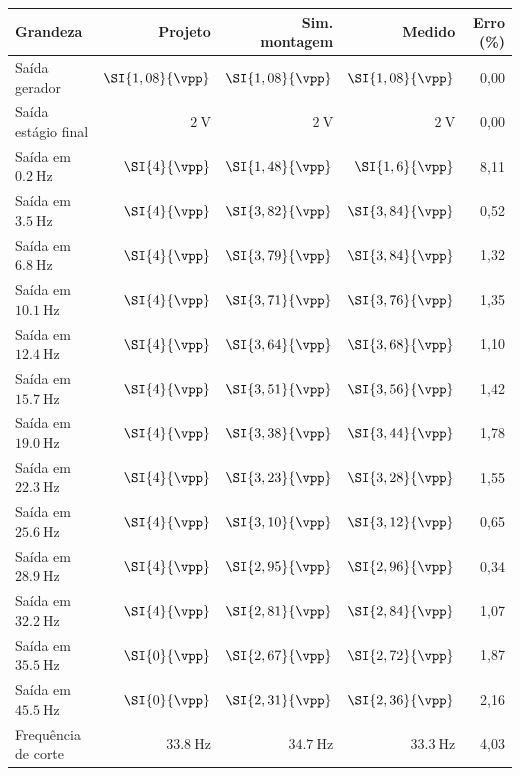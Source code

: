 \documentclass[11pt,a4paper]{article}
\begin{document}
\begin{center}
  \begin{tabular}{@{}lrrrr@{}}
    \toprule
    \textbf{Grandeza} & \textbf{Projeto} & \textbf{Sim. montagem} & \textbf{Medido} & \textbf{Erro (\%)} \\
    \midrule
    Saída gerador & $\SI{1,08}{\vpp}$ & $\SI{1,08}{\vpp}$ & $\SI{1,08}{\vpp}$ & 0,00 \\

    Saída estágio final & $\SI{2}{\volt}$ & $\SI{2}{\volt}$ & $\SI{2}{\volt}$ & 0,00 \\

    Saída em $\SI{0,2}{\hertz}$  & $\SI{4}{\vpp}$ & $\SI{1,48}{\vpp}$ & $\SI{1,6}{\vpp}$  & 8,11 \\
    Saída em $\SI{3,5}{\hertz}$  & $\SI{4}{\vpp}$ & $\SI{3,82}{\vpp}$ & $\SI{3,84}{\vpp}$ & 0,52 \\
    Saída em $\SI{6,8}{\hertz}$  & $\SI{4}{\vpp}$ & $\SI{3,79}{\vpp}$ & $\SI{3,84}{\vpp}$ & 1,32 \\
    Saída em $\SI{10,1}{\hertz}$ & $\SI{4}{\vpp}$ & $\SI{3,71}{\vpp}$ & $\SI{3,76}{\vpp}$ & 1,35 \\
    Saída em $\SI{12,4}{\hertz}$ & $\SI{4}{\vpp}$ & $\SI{3,64}{\vpp}$ & $\SI{3,68}{\vpp}$ & 1,10 \\
    Saída em $\SI{15,7}{\hertz}$ & $\SI{4}{\vpp}$ & $\SI{3,51}{\vpp}$ & $\SI{3,56}{\vpp}$ & 1,42 \\
    Saída em $\SI{19,0}{\hertz}$ & $\SI{4}{\vpp}$ & $\SI{3,38}{\vpp}$ & $\SI{3,44}{\vpp}$ & 1,78 \\
    Saída em $\SI{22,3}{\hertz}$ & $\SI{4}{\vpp}$ & $\SI{3,23}{\vpp}$ & $\SI{3,28}{\vpp}$ & 1,55 \\
    Saída em $\SI{25,6}{\hertz}$ & $\SI{4}{\vpp}$ & $\SI{3,10}{\vpp}$ & $\SI{3,12}{\vpp}$ & 0,65 \\
    Saída em $\SI{28,9}{\hertz}$ & $\SI{4}{\vpp}$ & $\SI{2,95}{\vpp}$ & $\SI{2,96}{\vpp}$ & 0,34 \\
    Saída em $\SI{32,2}{\hertz}$ & $\SI{4}{\vpp}$ & $\SI{2,81}{\vpp}$ & $\SI{2,84}{\vpp}$ & 1,07 \\
    Saída em $\SI{35,5}{\hertz}$ & $\SI{0}{\vpp}$ & $\SI{2,67}{\vpp}$ & $\SI{2,72}{\vpp}$ & 1,87 \\
    Saída em $\SI{45,5}{\hertz}$ & $\SI{0}{\vpp}$ & $\SI{2,31}{\vpp}$ & $\SI{2,36}{\vpp}$ & 2,16 \\

    Frequência de corte & $\SI{33,8}{\hertz}$ & $\SI{34,7}{\hertz}$ & $\SI{33,3}{\hertz}$ & 4,03 \\
    \bottomrule
  \end{tabular}
\end{center}
\end{document}
